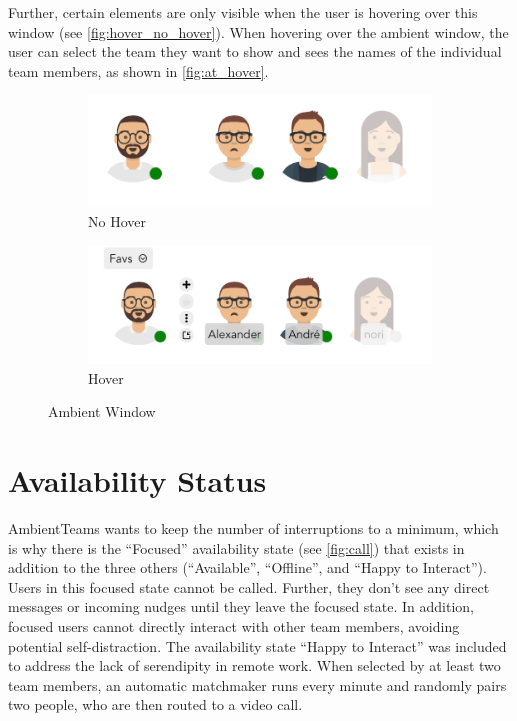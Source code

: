 Further, certain elements are only visible when the user is hovering over this window (see \autoref{fig:hover_no_hover}). When hovering over the ambient window, the user can select the team they want to show and sees the names of the individual team members, as shown in \autoref{fig:at_hover}.

\begin{figure}[h]
    \centering
    \begin{subfigure}{.5\textwidth}
        \centering
        \includegraphics[width=.8\linewidth]{./images/AT_no_hover.png}
        \caption{No Hover}
        \label{fig:at_no_hover}
    \end{subfigure}%
    \begin{subfigure}{.5\textwidth}
        \centering
        \includegraphics[width=.8\linewidth]{./images/AT_hover.png}
        \caption{Hover}
        \label{fig:at_hover}
    \end{subfigure}
    \caption{Ambient Window}
    \label{fig:hover_no_hover}
\end{figure}

\section{Availability Status}
AmbientTeams wants to keep the number of interruptions to a minimum, which is why there is the \enquote{Focused} availability state (see \autoref{fig:call}) that exists in addition to the three others (\enquote{Available}, \enquote{Offline}, and \enquote{Happy to Interact}). Users in this focused state cannot be called. Further, they don't see any direct messages or incoming nudges until they leave the focused state. In addition, focused users cannot directly interact with other team members, avoiding potential self-distraction. The availability state \enquote{Happy to Interact} was included to address the lack of serendipity in remote work. When selected by at least two team members, an automatic matchmaker runs every minute and randomly pairs two people, who are then routed to a video call.

